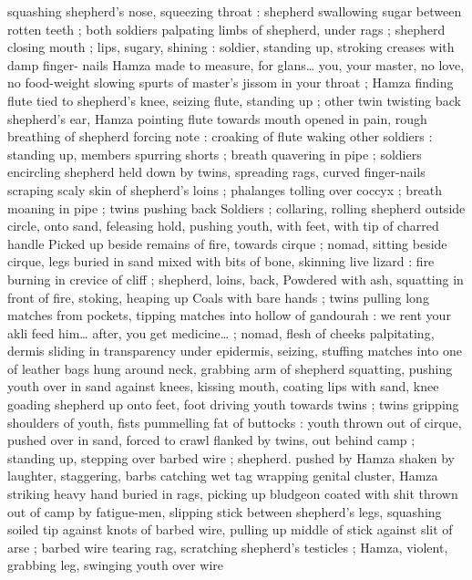 squashing shepherd's nose, squeezing throat : shepherd swallowing 
sugar between rotten teeth ; both soldiers palpating limbs of 
shepherd, under rags ; shepherd closing mouth ; lips, sugary, 
shining : soldier, standing up, stroking creases with damp finger- 
nails{\td} {\gl} Hamza{\td} made to measure, for glans{\ldots} you, your master, no 
love, no food-weight slowing spurts of master's jissom in your 
throat{\td} {\gr} ; Hamza finding flute tied to shepherd's knee, seizing flute, 
standing up ; other twin twisting back shepherd's ear, Hamza pointing 
flute towards mouth opened in pain, rough breathing of shepherd 
forcing note : croaking of flute waking other soldiers : standing up, 
members spurring shorts ; breath quavering in pipe ; soldiers 
encircling shepherd held down by twins, spreading rags, curved 
finger-nails scraping scaly skin of shepherd's loins ; phalanges 
tolling over coccyx ; breath moaning in pipe ; twins pushing back 
Soldiers ; collaring, rolling shepherd outside circle, onto sand, 
feleasing hold, pushing youth, with feet, with tip of charred handle 
Picked up beside remains of fire, towards cirque ; nomad, sitting 
beside cirque, legs buried in sand mixed with bits of bone, skinning 
live lizard : fire burning in crevice of cliff ; shepherd, loins, back, 
Powdered with ash, squatting in front of fire, stoking, heaping up 
Coals with bare hands ; twins pulling long matches from pockets, 
tipping matches into hollow of gandourah : {\gl} we rent your akli{\td} feed 
him{\ldots} after, you get medicine{\ldots} {\gr} ; nomad, flesh of cheeks palpitating, 
dermis sliding in transparency under epidermis, seizing, stuffing 
matches into one of leather bags hung around neck, grabbing arm of 
shepherd squatting, pushing youth over in sand against knees, 
kissing mouth, coating lips with sand, knee goading shepherd up 
onto feet, foot driving youth towards twins ; twins gripping shoulders 
of youth, fists pummelling fat of buttocks : youth thrown out of 
cirque, pushed over in sand, forced to crawl flanked by twins, out 
behind camp ; standing up, stepping over barbed wire ; shepherd. 
pushed by Hamza shaken by laughter, staggering, barbs catching wet 
tag wrapping genital cluster, Hamza striking heavy hand buried in 
rags, picking up bludgeon coated with shit thrown out of camp by 
fatigue-men, slipping stick between shepherd's legs, squashing 
soiled tip against knots of barbed wire, pulling up middle of stick 
against slit of arse ; barbed wire tearing rag, scratching shepherd's 
testicles ; Hamza, violent, grabbing leg, swinging youth over wire 
